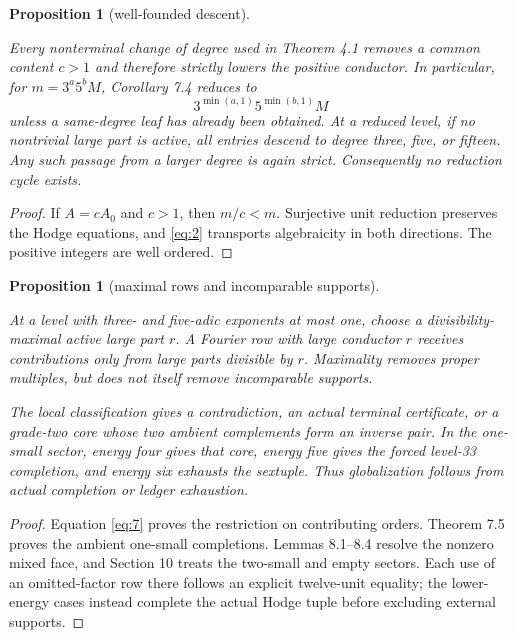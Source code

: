 \documentclass[11pt]{amsart}
\numberwithin{theorem}{section}
\newtheorem{proposition}[theorem]{Proposition}
\theoremstyle{remark}
\numberwithin{equation}{section}
\begin{document}
\begin{proposition}[well-founded descent]\label{proposition:5.2}

Every nonterminal change of degree used in Theorem 4.1 removes a common
content \(c>1\) and therefore strictly lowers the positive conductor.
In particular, for \(m=3^a5^bM\), Corollary 7.4 reduces to
\[
3^{\min(a,1)}5^{\min(b,1)}M
\tag{5.3}\label{eq:5.3}
\]
unless a same-degree leaf has already been obtained. At a reduced
level, if no nontrivial large part is active, all entries descend to
degree three, five, or fifteen. Any such passage from a larger degree
is again strict. Consequently no reduction cycle exists.

\end{proposition}
\begin{proof}

If \(A=cA_0\) and \(c>1\), then \(m/c<m\). Surjective unit reduction
preserves the Hodge equations, and \eqref{eq:2} transports algebraicity in both
directions. The positive integers are well ordered.
\end{proof}

\begin{proposition}[maximal rows and incomparable supports]\label{proposition:5.3}

At a level with three- and five-adic exponents at most one, choose a
divisibility-maximal active large part \(r\). A Fourier row with large
conductor \(r\) receives contributions only from large parts divisible
by \(r\). Maximality removes proper multiples, but does not itself
remove incomparable supports.

The local classification gives a contradiction, an actual terminal
certificate, or a grade-two core whose two ambient complements form
an inverse pair. In the one-small sector, energy four gives that
core, energy five gives the forced level-33 completion, and energy
six exhausts the sextuple. Thus globalization follows from actual
completion or ledger exhaustion.

\end{proposition}
\begin{proof}

Equation \eqref{eq:7} proves the restriction on contributing orders. Theorem
7.5 proves the ambient one-small completions. Lemmas 8.1--8.4 resolve
the nonzero mixed face, and Section 10 treats the two-small and empty
sectors. Each use of an omitted-factor row there follows an explicit
twelve-unit equality; the lower-energy cases instead complete the
actual Hodge tuple before excluding external supports.
\end{proof}
\end{document}
